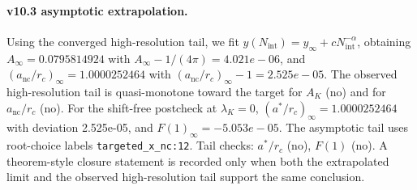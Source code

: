 \paragraph{v10.3 asymptotic extrapolation.}
Using the converged high-resolution tail, we fit $y(N_{\mathrm{int}})=y_{\infty}+cN_{\mathrm{int}}^{-\alpha}$, obtaining $A_\infty=0.0795814924$ with $A_\infty-1/(4\pi)=4.021e-06$, and $(a_{\mathrm{nc}}/r_c)_\infty=1.0000252464$ with $(a_{\mathrm{nc}}/r_c)_\infty-1=2.525e-05$. The observed high-resolution tail is quasi-monotone toward the target for $A_K$ (no) and for $a_{\mathrm{nc}}/r_c$ (no). For the shift-free postcheck at $\lambda_K=0$, $(a^*/r_c)_\infty=1.0000252464$ with deviation 2.525e-05, and $F(1)_\infty=-5.053e-05$. The asymptotic tail uses root-choice labels \texttt{targeted_x_nc:12}. Tail checks: $a^*/r_c$ (no), $F(1)$ (no). A theorem-style closure statement is recorded only when both the extrapolated limit and the
observed high-resolution tail support the same conclusion.
